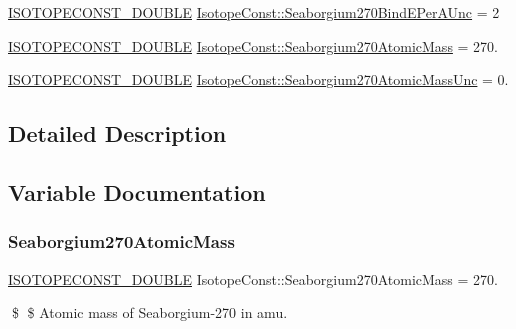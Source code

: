 \begin{DoxyCompactItemize}
\mbox{\hyperlink{group___isotope_const-_macros_ga8f45a7272ce02c0b4c65c44636ed719a}{I\+S\+O\+T\+O\+P\+E\+C\+O\+N\+S\+T\+\_\+\+D\+O\+U\+B\+LE}} \mbox{\hyperlink{group___isotope_const-_seaborgium-_sg270_gab607c69070fb4d46af9996465214885b}{Isotope\+Const\+::\+Seaborgium270\+Bind\+E\+Per\+A\+Unc}} = 2
\item 
\mbox{\hyperlink{group___isotope_const-_macros_ga8f45a7272ce02c0b4c65c44636ed719a}{I\+S\+O\+T\+O\+P\+E\+C\+O\+N\+S\+T\+\_\+\+D\+O\+U\+B\+LE}} \mbox{\hyperlink{group___isotope_const-_seaborgium-_sg270_gab645733617270a4ebb26b1b225323444}{Isotope\+Const\+::\+Seaborgium270\+Atomic\+Mass}} = 270.
\item 
\mbox{\hyperlink{group___isotope_const-_macros_ga8f45a7272ce02c0b4c65c44636ed719a}{I\+S\+O\+T\+O\+P\+E\+C\+O\+N\+S\+T\+\_\+\+D\+O\+U\+B\+LE}} \mbox{\hyperlink{group___isotope_const-_seaborgium-_sg270_ga2e05196b1e2c106ea7fcdb35e659e31c}{Isotope\+Const\+::\+Seaborgium270\+Atomic\+Mass\+Unc}} = 0.
\end{DoxyCompactItemize}


\subsection{Detailed Description}


\subsection{Variable Documentation}
\mbox{\label{group___isotope_const-_seaborgium-_sg270_gab645733617270a4ebb26b1b225323444}} 
\subsubsection{\texorpdfstring{Seaborgium270\+Atomic\+Mass}{Seaborgium270AtomicMass}}
{\footnotesize\ttfamily \mbox{\hyperlink{group___isotope_const-_macros_ga8f45a7272ce02c0b4c65c44636ed719a}{I\+S\+O\+T\+O\+P\+E\+C\+O\+N\+S\+T\+\_\+\+D\+O\+U\+B\+LE}} Isotope\+Const\+::\+Seaborgium270\+Atomic\+Mass = 270.}

\$ \$ Atomic mass of Seaborgium-\/270 in amu. \mbox{\label{group___isotope_const-_seaborgium-_sg270_ga2e05196b1e2c106ea7fcdb35e659e31c}} 
